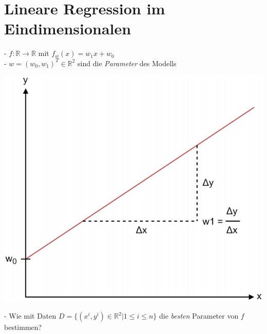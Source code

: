 \documentclass{report}
\begin{document}
  \section{Lineare Regression im Eindimensionalen}	
  - $f : \mathbb{R} \rightarrow \mathbb{R}$ mit $f_w(x) = w_1x + w_0$\\	
  - $w = (w_0, w_1)^T \in \mathbb{R}^2$ sind die \textit{Parameter} des Modells	
  \begin{center}	
    \includegraphics[scale=0.275]{ml02_1}	
  \end{center}	
  - Wie mit Daten $D = \{(x^i, y^i) \in \mathbb{R}^2 | 1 \leq i \leq n\}$ die \textit{besten} Parameter von $f$ bestimmen?\\	
\end{document}
